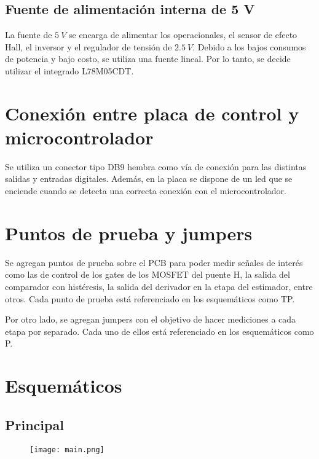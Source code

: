 \subsection{Fuente de alimentación interna de 5 V}

La fuente de $5\:V$ se encarga de alimentar los operacionales, el sensor de efecto Hall, el inversor y el regulador de tensión de $2.5\:V$. Debido a los bajos consumos de potencia y bajo costo, se utiliza una fuente lineal. Por lo tanto, se decide utilizar el integrado L78M05CDT.

\section{Conexión entre placa de control y microcontrolador}

Se utiliza un conector tipo DB9 hembra como vía de conexión para las distintas salidas y entradas digitales. Además, en la placa se dispone de un led que se enciende cuando  se detecta una correcta conexión con el microcontrolador.

\section{Puntos de prueba y jumpers}

Se agregan puntos de prueba sobre el PCB para poder medir señales de interés como las de control de los gates de los MOSFET del puente H, la salida del comparador con histéresis, la salida del derivador en la etapa del estimador, entre otros. Cada punto de prueba está referenciado en los esquemáticos como TP.

Por otro lado, se agregan jumpers con el objetivo de hacer mediciones a cada etapa por separado. Cada uno de ellos está referenciado en los esquemáticos como P.
 

\section{Esquemáticos}

\subsection{Principal}
\begin{figure}[H]
	\centering
	\texttt{[image: main.png]}
	\label{fig:main}
\end{figure}

